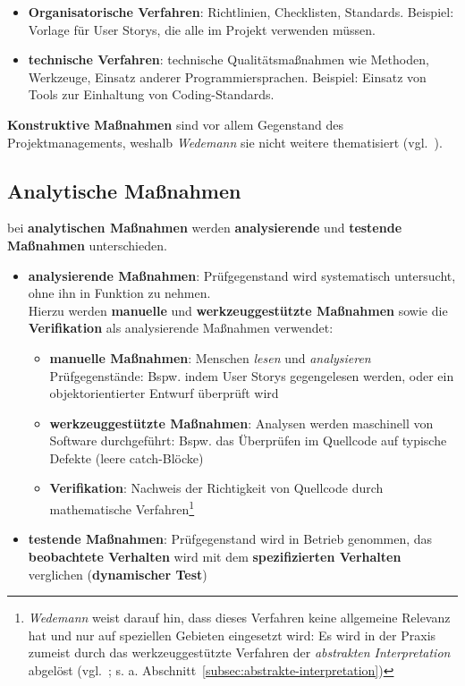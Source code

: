 \begin{itemize}
    \item \textbf{Organisatorische Verfahren}: Richtlinien, Checklisten, Standards. Beispiel: Vorlage für User Storys, die alle im Projekt verwenden müssen.
    \item \textbf{technische Verfahren}: technische Qualitätsmaßnahmen wie Methoden, Werkzeuge, Einsatz anderer Programmiersprachen. Beispiel: Einsatz von Tools zur Einhaltung von Coding-Standards.
\end{itemize}

\noindent
\textbf{Konstruktive Maßnahmen} sind vor allem Gegenstand des Projektmanagements, weshalb \textit{Wedemann} sie nicht weitere thematisiert (vgl.~\cite[9]{Wed09c}).


\subsection*{Analytische Maßnahmen}
bei \textbf{analytischen Maßnahmen} werden \textbf{analysierende} und \textbf{testende Maßnahmen} unterschieden.

\begin{itemize}
    \item \textbf{analysierende Maßnahmen}: Prüfgegenstand wird systematisch untersucht, ohne ihn in Funktion zu nehmen.\\
    Hierzu werden \textbf{manuelle} und \textbf{werkzeuggestützte Maßnahmen} sowie die \textbf{Verifikation} als analysierende Maßnahmen verwendet:
    \begin{itemize}
        \item \textbf{manuelle Maßnahmen}: Menschen \textit{lesen} und \textit{analysieren} Prüfgegenstände: Bspw. indem User Storys gegengelesen werden, oder ein objektorientierter Entwurf überprüft wird
        \item \textbf{werkzeuggestützte Maßnahmen}: Analysen werden maschinell von Software durchgeführt: Bspw. das Überprüfen im Quellcode auf typische Defekte (leere catch-Blöcke)
        \item \textbf{Verifikation}: Nachweis der Richtigkeit von Quellcode durch mathematische Verfahren\footnote{
        \textit{Wedemann} weist darauf hin, dass dieses Verfahren keine allgemeine Relevanz hat und nur auf speziellen Gebieten eingesetzt wird: Es wird in der Praxis zumeist durch das werkzeuggestützte Verfahren der \textit{abstrakten Interpretation} abgelöst (vgl.~\cite[9]{Wed09c}; s. a. Abschnitt~\ref{subsec:abstrakte-interpretation})
        }
    \end{itemize}
    \item  \textbf{testende Maßnahmen}: Prüfgegenstand wird in Betrieb genommen, das \textbf{beobachtete Verhalten} wird mit dem \textbf{spezifizierten Verhalten} verglichen (\textbf{dynamischer Test})
\end{itemize}

